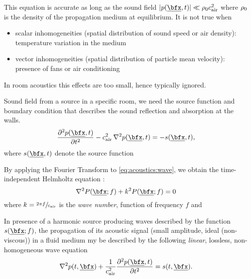 This equation is accurate as long as the sound field $\abs{\pressure(\positionMicrophone, t)} \ll \densityEq \cair^2$
where $\rho_0$ is the density of the propagation medium at equilibrium. It is not true when
\begin{itemize}
    \item scalar inhomogeneities (spatial distribution of sound speed or air density): temperature variation in the medium
    \item vector inhomogeneities (spatial distribution of particle mean velocity): presence of fans or air conditioning
\end{itemize}
In room acoustics this effects are too small, hence typically ignored.

Sound field from a source in a specific room, we need the source function and boundary condition that describes the sound reflection and absorption at the walls.
\begin{equation}
    \label{eq:acoustics:wave}
    \kpderiv[2]{\pressure(\positionMicrophone, t)}{t} - \cair^2 \knabla^2 \pressure(\positionMicrophone, t) = - \contSource(\positionMicrophone, t)
    ,
\end{equation}
where $\contSource(\positionMicrophone, t)$ denote the source function \cite{Room Impulse Response Generator, Habets}

By applying the Fourier Transform to \cref{eq:acoustics:wave}, we obtain the time-independent Helmholtz equation
:
\begin{equation}
    \knabla^2 P(\positionMicrophone ; f) + k^2 P(\positionMicrophone ; f) = 0
\end{equation}
where $k = \sfrac{2 \pi f}{c_\text{air}}$ is the \textit{wave number}, function of frequency $f$ and


In presence of a harmonic source producing waves described by the function $s(\positionMicrophone ; f)$, the propagation of its acoustic
signal (small amplitude, ideal (non-viscous)) in a fluid medium my be described by the following \textit{linear}, lossless, non-homogeneous wave equation
\begin{equation}
    \label{eq:acoustics:helmholtzSource}
    \knabla^2 p(t, \positionMicrophone) + \frac{1}{\cair^2} \kpderiv[2]{\pressure(\positionMicrophone, t)}{t} = s(t, \positionMicrophone).
\end{equation}

